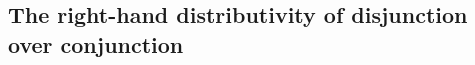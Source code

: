 \begin{appendices}
\section{The right-hand distributivity of disjunction over conjunction}
\label{code:and-distributive-right}
\begin{code}
    \>[2]\AgdaSpace{}%
    \AgdaSymbol{:}\AgdaSpace{}%
    \AgdaSymbol{((}\AgdaSpace{}%
    \AgdaSpace{}%
    \AgdaSymbol{)}\AgdaSpace{}%
    \AgdaSpace{}%
    \AgdaSymbol{)}\AgdaSpace{}%
    \AgdaSpace{}%
    \AgdaSymbol{((}\AgdaSpace{}%
    \AgdaSpace{}%
    \AgdaSymbol{)}\AgdaSpace{}%
    \AgdaSpace{}%
    \AgdaSymbol{(}\AgdaSpace{}%
    \AgdaSpace{}%
    \AgdaSymbol{))}\<%
    \\
    \>[2]\AgdaSpace{}%
    \AgdaSymbol{(}\AgdaSpace{}%
    \AgdaSpace{}%
    \AgdaOperator{\AgdaInductiveConstructor{,}}\AgdaSpace{}%
    \AgdaSymbol{)}\AgdaSpace{}%
    \AgdaSymbol{=}\AgdaSpace{}%
    \AgdaSpace{}%
    \AgdaSymbol{(}\AgdaSpace{}%
    \AgdaOperator{\AgdaInductiveConstructor{,}}\AgdaSpace{}%
    \AgdaSymbol{)}\<%
    \\
    \>[2]\AgdaSpace{}%
    \AgdaSymbol{(}\AgdaSpace{}%
    \AgdaSpace{}%
    \AgdaOperator{\AgdaInductiveConstructor{,}}\AgdaSpace{}%
    \AgdaSymbol{)}\AgdaSpace{}%
    \AgdaSymbol{=}\AgdaSpace{}%
    \AgdaSpace{}%
    \AgdaSymbol{(}\AgdaSpace{}%
    \AgdaOperator{\AgdaInductiveConstructor{,}}\AgdaSpace{}%
    \AgdaSymbol{)}\<%
    \\
    \\[\AgdaEmptyExtraSkip]%
    \>[2]\AgdaSpace{}%
    \AgdaSymbol{:}\AgdaSpace{}%
    \AgdaSymbol{((}\AgdaSpace{}%
    \AgdaSpace{}%
    \AgdaSymbol{)}\AgdaSpace{}%
    \AgdaSpace{}%
    \AgdaSymbol{)}\AgdaSpace{}%

\end{code}
\end{appendices}
